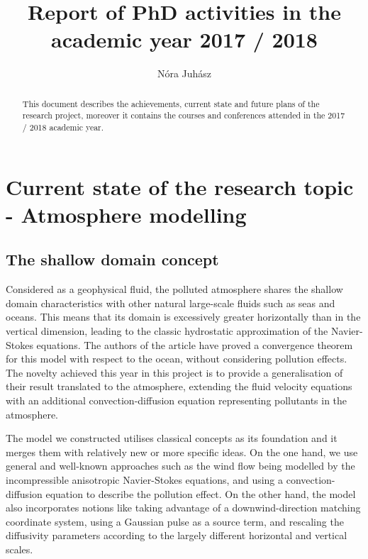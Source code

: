 \documentclass{article}
\title{Report of PhD activities in the academic year 2017 / 2018}
\author{N\'ora Juh\'asz}
\begin{document}
\maketitle
\newpage

\begin{abstract}

This document describes the achievements, current state and future plans of the research project, moreover it contains the courses and conferences attended in the 2017 / 2018 academic year.\\

\end{abstract}
\newpage

\tableofcontents
\newpage

\section{Current state of the research topic - Atmosphere modelling}

\subsection{The shallow domain concept}

Considered as a geophysical fluid, the polluted atmosphere shares the shallow domain characteristics with other natural large-scale fluids such as seas and oceans. This means that its domain is excessively greater horizontally than in the vertical dimension, leading to the classic hydrostatic approximation of the Navier-Stokes equations. The authors of the \cite{azerad2001mathematical} article have proved a convergence theorem for this model with respect to the ocean, without considering pollution effects. The novelty achieved this year in this project is to provide a generalisation of their result translated to the atmosphere, extending the fluid velocity equations with an additional convection-diffusion equation representing pollutants in the atmosphere.

The model we constructed utilises classical concepts as its foundation and it merges them with relatively new or more specific ideas. On the one hand, we use general and well-known approaches such as the wind flow being modelled by the incompressible anisotropic Navier-Stokes equations, and using a convection-diffusion equation to describe the pollution effect. On the other hand, the model also incorporates notions like taking advantage of a downwind-direction matching coordinate system, using a Gaussian pulse as a source term, and rescaling the diffusivity parameters according to the largely different horizontal and vertical scales. 
\end{document}
